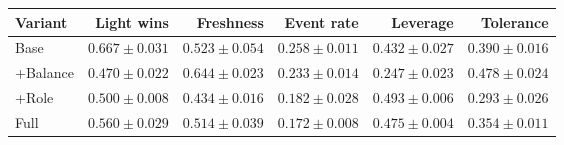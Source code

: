 \begin{tabular}{lrrrrr}
\toprule
Variant & Light wins & Freshness & Event rate & Leverage & Tolerance\\
\midrule
Base & $0.667\pm0.031$ & $0.523\pm0.054$ & $0.258\pm0.011$ & $0.432\pm0.027$ & $0.390\pm0.016$\\
+Balance & $0.470\pm0.022$ & $0.644\pm0.023$ & $0.233\pm0.014$ & $0.247\pm0.023$ & $0.478\pm0.024$\\
+Role & $0.500\pm0.008$ & $0.434\pm0.016$ & $0.182\pm0.028$ & $0.493\pm0.006$ & $0.293\pm0.026$\\
Full & $0.560\pm0.029$ & $0.514\pm0.039$ & $0.172\pm0.008$ & $0.475\pm0.004$ & $0.354\pm0.011$\\
\bottomrule
\end{tabular}
